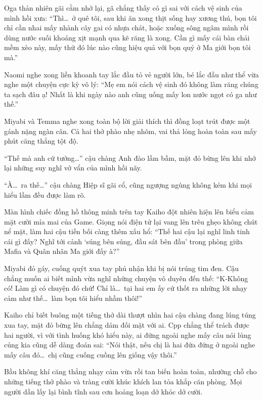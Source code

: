 \documentclass[../main.tex]{subfiles}
\begin{document}
Oga thản nhiên gãi cằm nhớ lại, gã chẳng thấy có gì sai với cách vệ sinh của mình hồi xưa: ``Thì\dots\ ở quê tôi, sau khi ăn xong thịt sống hay xương thú, bọn tôi chỉ cần nhai mấy nhành cây gai có nhựa chát, hoặc xuống sông ngâm mình rồi dùng nước suối khoáng xịt mạnh qua kẽ răng là xong. Cần gì mấy cái bàn chải mềm xèo này, mấy thứ đó lúc nào cũng hiệu quả với bọn quỷ ở Ma giới bọn tôi mà.''

Naomi nghe xong liền khoanh tay lắc đầu tỏ vẻ người lớn, bé lắc đầu như thể vừa nghe một chuyện cực kỳ vô lý: ``Mẹ em nói cách vệ sinh đó không làm răng chúng ta sạch đâu ạ! Nhất là khi ngày nào anh cũng uống mấy lon nước ngọt có ga như thế.''

Miyabi và Temma nghe xong toàn bộ lời giải thích thì đồng loạt trút được một gánh nặng ngàn cân. Cả hai thở phào nhẹ nhõm, vai thả lỏng hoàn toàn sau mấy phút căng thẳng tột độ.

``Thế mà anh cứ tưởng\dots'' cậu chàng Anh đào lầm bầm, mặt đỏ bừng lên khi nhớ lại những suy nghĩ vớ vẩn của mình hồi nãy.

``À\dots\ ra thế\dots'' cậu chàng Hiệp sĩ gãi cổ, cũng ngượng ngùng không kém khi mọi hiểu lầm đều được làm rõ.

Màn hình chiếc đồng hồ thông minh trên tay Kaiho đột nhiên hiện lên biểu cảm mặt cười mỉa mai của Game. Giọng nói điện tử lại vang lên trêu ghẹo không chút nể mặt, làm hai cậu tiền bối càng thêm xấu hổ: ``Thế hai cậu lại nghĩ linh tinh cái gì đấy? Nghĩ tới cảnh `súng bên súng, đầu sát bên đầu' trong phòng giữa Mafia và Quân nhân Ma giới đấy à?''

Miyabi đỏ gáy, cuống quýt xua tay phủ nhận khi bị nói trúng tim đen. Cậu chẳng muốn ai biết mình vừa nghĩ những chuyện vô duyên đến thế: ``K-Không có! Làm gì có chuyện đó chứ! Chỉ là\dots\ tại hai em ấy cứ thốt ra những lời nhạy cảm như thế\dots\ làm bọn tôi hiểu nhầm thôi!''

Kaiho chỉ biết buông một tiếng thở dài thượt nhìn hai cậu chàng đang lúng túng xua tay, mặt đỏ bừng lên chẳng dám đối mặt với ai. Cpp chẳng thể trách được hai người, vì với tình huống khó hiểu này, ai đứng ngoài nghe mấy câu nói lủng củng kia cũng dễ dàng đoán sai: ``Nói thật, nếu chị là hai đứa đứng ở ngoài nghe mấy câu đó\dots\ chị cũng cuống cuồng lên giống vậy thôi.''

\ct

Bầu không khí căng thẳng nhạy cảm vừa rồi tan biến hoàn toàn, nhường chỗ cho những tiếng thở phào và tràng cười khúc khích lan tỏa khắp căn phòng. Mọi người dần lấy lại bình tĩnh sau cơn hoảng loạn dở khóc dở cười.
\end{document}
